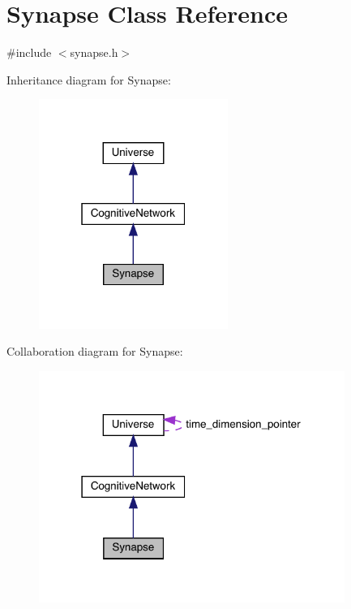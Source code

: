 \hypertarget{class_synapse}{}\section{Synapse Class Reference}
\label{class_synapse}


{\ttfamily \#include $<$synapse.\+h$>$}



Inheritance diagram for Synapse\+:\nopagebreak
\begin{figure}[H]
\begin{center}
\leavevmode
\includegraphics[width=175pt]{class_synapse__inherit__graph}
\end{center}
\end{figure}


Collaboration diagram for Synapse\+:\nopagebreak
\begin{figure}[H]
\begin{center}
\leavevmode
\includegraphics[width=283pt]{class_synapse__coll__graph}
\end{center}
\end{figure}
